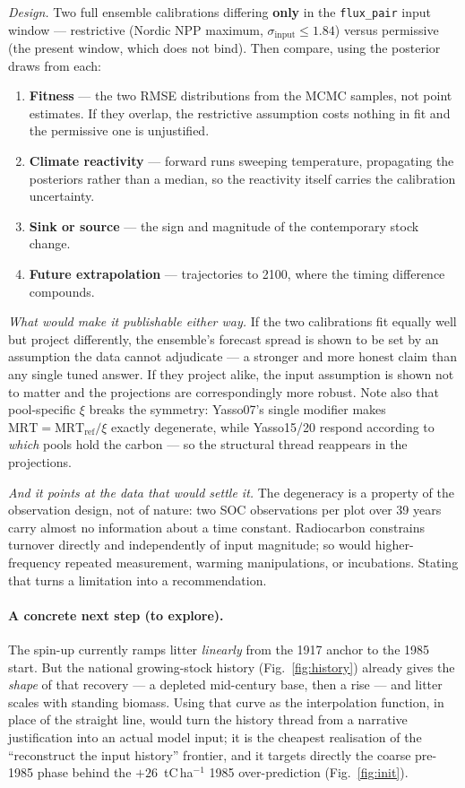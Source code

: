 \documentclass[11pt]{article}
\newcommand{\sinput}{\sigma_{\mathrm{input}}}
\begin{document}
\begin{provisional}
\emph{Design.} Two full ensemble calibrations differing \textbf{only} in the \texttt{flux\_pair}
input window --- restrictive (Nordic NPP maximum, $\sinput \le 1.84$) versus permissive (the
present window, which does not bind). Then compare, using the posterior draws from each:
\begin{enumerate}\itemsep2pt
\item \textbf{Fitness} --- the two RMSE distributions from the MCMC samples, not point estimates. If
they overlap, the restrictive assumption costs nothing in fit and the permissive one is unjustified.
\item \textbf{Climate reactivity} --- forward runs sweeping temperature, propagating the posteriors
rather than a median, so the reactivity itself carries the calibration uncertainty.
\item \textbf{Sink or source} --- the sign and magnitude of the contemporary stock change.
\item \textbf{Future extrapolation} --- trajectories to 2100, where the timing difference compounds.
\end{enumerate}

\emph{What would make it publishable either way.} If the two calibrations fit equally well but
project differently, the ensemble's forecast spread is shown to be set by an assumption the data
cannot adjudicate --- a stronger and more honest claim than any single tuned answer. If they project
alike, the input assumption is shown not to matter and the projections are correspondingly more
robust. Note also that pool-specific $\xi$ breaks the symmetry: Yasso07's single modifier makes
$\mathrm{MRT}=\mathrm{MRT}_{\mathrm{ref}}/\xi$ exactly degenerate, while Yasso15/20 respond according
to \emph{which} pools hold the carbon --- so the structural thread reappears in the projections.

\emph{And it points at the data that would settle it.} The degeneracy is a property of the
observation design, not of nature: two SOC observations per plot over 39 years carry almost no
information about a time constant. Radiocarbon constrains turnover directly and independently of
input magnitude; so would higher-frequency repeated measurement, warming manipulations, or
incubations. Stating that turns a limitation into a recommendation.
\end{provisional}

\paragraph{A concrete next step (to explore).} The spin-up currently ramps litter \emph{linearly} from the 1917
anchor to the 1985 start. But the national growing-stock history (Fig.~\ref{fig:history}) already gives the
\emph{shape} of that recovery --- a depleted mid-century base, then a rise --- and litter scales with standing
biomass. Using that curve as the interpolation function, in place of the straight line, would turn the history
thread from a narrative justification into an actual model input; it is the cheapest realisation of the
``reconstruct the input history'' frontier, and it targets directly the coarse pre-1985 phase behind the
$+26$~tC\,ha$^{-1}$ 1985 over-prediction (Fig.~\ref{fig:init}).
\end{document}
